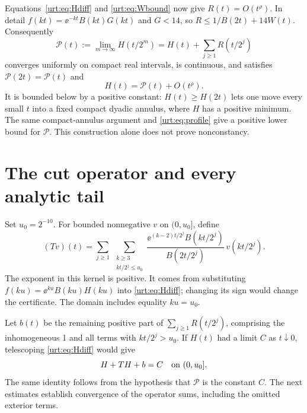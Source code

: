 \documentclass[11pt,letterpaper]{article}
\theoremstyle{remark}\newtheorem{remark}[theorem]{Remark}
\newcommand{\Pc}{\mathcal P}\newcommand{\Bc}{\mathcal B}\newcommand{\dd}{\mathrm d}
\begin{document}
Equations~\eqref{urt:eq:Hdiff} and \eqref{urt:eq:Wbound} now give $R(t)=O(t^\rho)$. In detail $f(kt)=\ee^{-kt}B(kt)G(kt)$ and $G<14$, so $R\le1/B(2t)+14W(t)$. Consequently
\begin{equation}\label{urt:eq:profile}
 \Pc(t):=\lim_{m\to\infty}H(t/2^m)
 =H(t)+\sum_{j\ge1}R(t/2^j)
\end{equation}
converges uniformly on compact real intervals, is continuous, and satisfies $\Pc(2t)=\Pc(t)$ and
\begin{equation}\label{urt:eq:radialequiv}
 H(t)=\Pc(t)+O(t^\rho).
\end{equation}
It is bounded below by a positive constant: $H(t)\ge H(2t)$ lets one move every small $t$ into a fixed compact dyadic annulus, where $H$ has a positive minimum. The same compact-annulus argument and \eqref{urt:eq:profile} give a positive lower bound for $\Pc$. This construction alone does not prove nonconstancy.

\section{The cut operator and every analytic tail}\label{urt:sec:operator}
Set $u_0=2^{-10}$. For bounded nonnegative $v$ on $(0,u_0]$, define
\begin{equation}\label{urt:eq:operator}
 (Tv)(t)=\sum_{j\ge1}\ \sum_{\substack{k\ge3\\kt/2^j\le u_0}}
 \frac{\ee^{(k-2)t/2^j}B(kt/2^j)}{B(2t/2^j)}\,v(kt/2^j).
\end{equation}
The exponent in this kernel is positive. It comes from substituting $f(ku)=\ee^{ku}B(ku)H(ku)$ into \eqref{urt:eq:Hdiff}; changing its sign would change the certificate. The domain includes equality $ku=u_0$.

Let $b(t)$ be the remaining positive part of $\sum_{j\ge1}R(t/2^j)$, comprising the inhomogeneous 1 and all terms with $kt/2^j>u_0$. If $H(t)$ had a limit $C$ as $t\downarrow0$, telescoping \eqref{urt:eq:Hdiff} would give
\begin{equation}\label{urt:eq:conditional}
 H+TH+b=C\quad\hbox{on }(0,u_0].
\end{equation}
The same identity follows from the hypothesis that $\Pc$ is the constant $C$. The next estimates establish convergence of the operator sums, including the omitted exterior terms.
\end{document}
